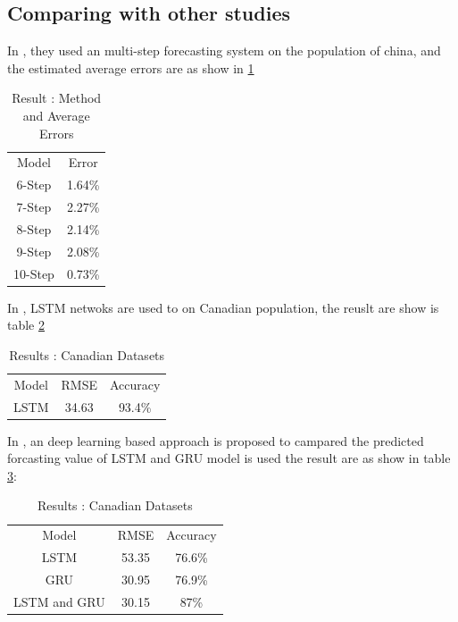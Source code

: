 \subsection{Comparing with other studies}
%
In \cite{hu2020artificial}, they used an multi-step forecasting system on
the population of china, and the estimated average errors are as show in
\ref{table:three}

\begin{table}[ht!]
	\centering
	\caption{Result \cite{hu2020artificial}: Method and Average Errors}
	\begin{tabular}{c c }
		Model & Error  \\
		6-Step & 1.64\% \\
		7-Step & 2.27\% \\
		8-Step & 2.14\% \\
		9-Step & 2.08\% \\
		10-Step & 0.73\%
	\end{tabular}
	\label{table:three}
\end{table}


In \cite{chimmula2020time}, LSTM netwoks are used to on Canadian population,
the reuslt are show is table \ref{table:four}

\begin{table}[ht!]
	\centering
	\caption{Results \cite{chimmula2020time}: Canadian Datasets}
	\begin{tabular}{c c c}
		Model & RMSE & Accuracy \\
		LSTM & 34.63 & 93.4\%

	\end{tabular}
	\label{table:four}
\end{table}


In \cite{bandyopadhyay2020machine}, an deep learning based approach is
proposed to campared the predicted forcasting value of LSTM and GRU model is
used the result are as show in table \ref{table:seven}:

\begin{table}[ht!]
	\centering
	\caption{Results \cite{chimmula2020time}: Canadian Datasets}
	\begin{tabular}{c c c}
		Model & RMSE & Accuracy \\
		LSTM & 53.35 & 76.6\% \\
		GRU & 30.95 & 76.9\% \\
		LSTM and GRU & 30.15 & 87\%

	\end{tabular}
	\label{table:seven}
\end{table}


